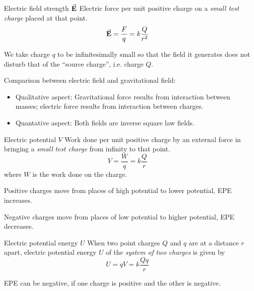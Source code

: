 \begin{defn}{Electric field strength $\va{E}$}{}
Electric force per unit positive charge on a \emph{small test charge} placed at that point.
\begin{equation} \va{E}=\frac{F}{q}=k\frac{Q}{r^2} \end{equation}
\end{defn}

\begin{remark}
We take charge $q$ to be infinitesimally small so that the field it generates does not disturb that of the ``source charge'', i.e. charge $Q$.
\end{remark}

Comparison between electric field and gravitational field:
\begin{itemize}
\item Qualitative aspect: Gravitational force results from interaction between masses; electric force results from interaction between charges.
\item Quantative aspect: Both fields are inverse square law fields.
\end{itemize}

\begin{defn}{Electric potential $V$}{}
Work done per unit positive charge by an external force in bringing a \emph{small test charge} from infinity to that point.
\begin{equation} V=\frac{W}{q}=k\frac{Q}{r} \end{equation}
where $W$ is the work done on the charge.
\end{defn}

Positive charges move from places of high potential to lower potential, EPE increases.

Negative charges move from places of low potential to higher potential, EPE decreases.

\begin{defn}{Electric potential energy $U$}{}
When two point charges $Q$ and $q$ are at a distance $r$ apart, electric potential energy $U$ of the \emph{system of two charges} is given by 
\begin{equation} U=qV=k\frac{Qq}{r} \end{equation}
\end{defn}

\begin{remark}
EPE can be negative, if one charge is positive and the other is negative.
\end{remark}

